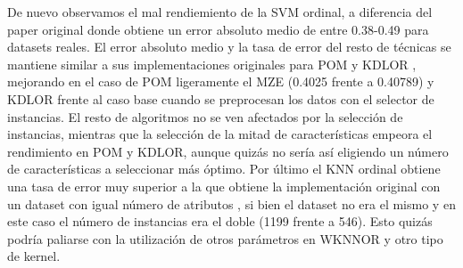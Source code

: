 De nuevo observamos el mal rendiemiento de la SVM ordinal, a diferencia del paper original \cite{waegeman2009ensemble} donde obtiene un error absoluto medio de entre 0.38-0.49 para datasets reales. El error absoluto medio y la tasa de error del resto de técnicas se mantiene similar a sus implementaciones originales para POM y KDLOR \cite{Gutiérrez2016} \cite{sun2010kernel}, mejorando en el caso de POM ligeramente el MZE (0.4025 frente a 0.40789) y KDLOR frente al caso base cuando se preprocesan los datos con el selector de instancias. El resto de algoritmos no se ven afectados por la selección de instancias, mientras que la selección de la mitad de características empeora el rendimiento en POM y KDLOR, aunque quizás no sería así eligiendo un número de características a seleccionar más óptimo. Por último el KNN ordinal obtiene una tasa de error muy superior a la que obtiene la implementación original con un dataset con igual número de atributos \cite{duivesteijn2008nearest}, si bien el dataset no era el mismo y en este caso el número de instancias era el doble (1199 frente a 546). Esto quizás podría paliarse con la utilización de otros parámetros en WKNNOR y otro tipo de kernel. 


